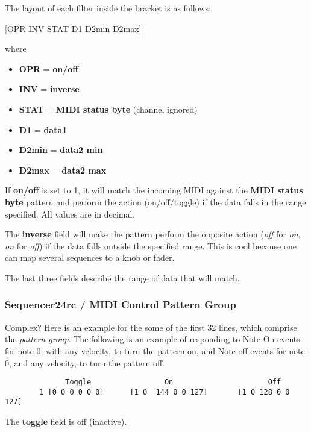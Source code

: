    The layout of each filter inside the bracket is as follows:

      [OPR INV STAT D1 D2min D2max]

   where

   \begin{itemize}
      \item \textbf{OPR} = \textbf{on/off}
      \item \textbf{INV} = \textbf{inverse}
      \item \textbf{STAT} = \textbf{MIDI status byte} (channel ignored) 
      \item \textbf{D1} = \textbf{data1}
      \item \textbf{D2min} = \textbf{data2 min}
      \item \textbf{D2max} = \textbf{data2 max}
   \end{itemize}

   If \textbf{on/off} is set to 1, it will match the incoming MIDI against
   the \textbf{MIDI status byte} pattern and perform the action
   (on/off/toggle) if the data falls in the range specified.  All values are
   in decimal.

	The \textbf{inverse} field will make the pattern perform the opposite 
   action (\textsl{off} for \textsl{on}, \textsl{on} for \textsl{off}) if
   the data falls outside the specified range.  This is cool because one can
   map several sequences to a knob or fader.

	The last three fields describe the range of data that will match.

\subsubsection{Sequencer24rc / MIDI Control Pattern Group}
\label{subsubsec:seq24_rc_file_midi_control_pattern_group}

   Complex?  Here is an example for the some of the first 32 lines, which
   comprise the \textsl{pattern group}.
   The following is an example of responding
   to Note On events for note 0, with any velocity, to turn the pattern on,
   and Note off events for note 0, and any velocity, to turn the pattern
   off.

   \begin{verbatim}
	          Toggle                 On                      Off
        1 [0 0 0 0 0 0]      [1 0  144 0 0 127]       [1 0 128 0 0 127]
   \end{verbatim}

   The \textbf{toggle} field is off (inactive).


